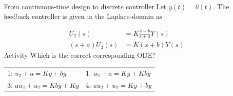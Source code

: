 \documentclass[presentation,aspectratio=169]{beamer}
\begin{document}
\begin{frame}[label={sec:org15df7f9}]{From continuous-time design to discrete controller}
Let \(y(t)=\theta(t)\). The feedback controller is given in the Laplace-domain as 
\begin{center}
\end{center}
\begin{align*}
U_2(s) &= K \frac{s+b}{s+a} Y(s)\\
(s+a)U_2(s) &= K(s+b)Y(s)
\end{align*}
\alert{Activity} Which is the correct corresponding ODE?
\begin{center}
\begin{tabular}{ll}
1: \(\dot{u}_2 + a = K\dot{y} + by\) & 1: \(\dot{u}_2 + a = K\dot{y} + Kby\)\\
3: \(a u_2 + \dot{u}_2 = Kby + K\dot{y}\) & 4: \(a u_2 + \dot{u}_2 = K\dot{y} + by\)\\
\end{tabular}
\end{center}
\end{frame}
\end{document}
